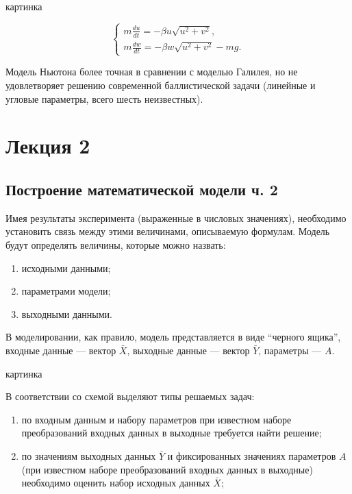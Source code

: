 \documentclass[12pt]{article}
\begin{document}
\begin{center}
    картинка
\end{center}

\[
\begin{cases}
    m \frac{du}{dt} = - \beta u \sqrt{u^2 + v^2},\\
    m \frac{dw}{dt} = - \beta w \sqrt{u^2 + v^2} - mg.
\end{cases}
\]

Модель Ньютона более точная в сравнении с моделью Галилея, но не удовлетворяет решению современной баллистической задачи (линейные и угловые параметры, всего шесть неизвестных).

\newpage
\section{Лекция 2}
\subsection{Построение математической модели ч. 2}
Имея результаты эксперимента (выраженные в числовых значениях), необходимо установить связь между этими величинами, описываемую формулам. Модель будут определять величины, которые можно назвать:
\begin{enumerate}
    \item исходными данными;
    \item параметрами модели;
    \item выходными данными.
\end{enumerate}

В моделировании, как правило, модель представляется в виде \enquote{черного ящика}, входные данные --- вектор $\bar{X}$, выходные данные --- вектор $\bar{Y}$, параметры --- $A$.

\begin{center}
    картинка
\end{center}

В соответствии со схемой выделяют типы решаемых задач:

\begin{enumerate}
    \item по входным данным и набору параметров при известном наборе преобразований входных данных в выходные требуется найти решение;
    \item по значениям выходных данных $\bar{Y}$ и фиксированных значениях параметров $A$ (при известном наборе преобразований входных данных в выходные) необходимо оценить набор исходных данных $\bar{X}$;
\end{enumerate}
\end{document}
